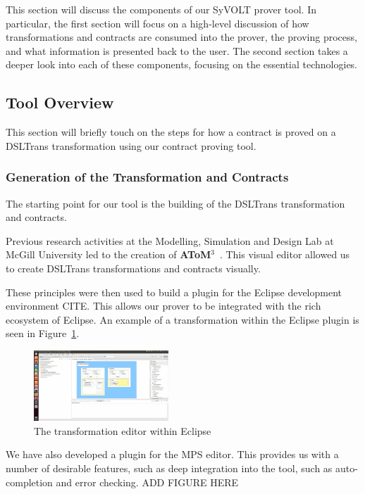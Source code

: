 This section will discuss the components of our SyVOLT prover tool. In particular, the first section will focus on a high-level discussion of how transformations and contracts are consumed into the prover, the proving process, and what information is presented back to the user. The second section takes a deeper look into each of these components, focusing on the essential technologies.

\subsection{Tool Overview}
This section will briefly touch on the steps for how a contract is proved on a DSLTrans transformation using our contract proving tool.


\subsubsection{Generation of the Transformation and Contracts}
The starting point for our tool is the building of the DSLTrans transformation and contracts.

Previous research activities at the Modelling, Simulation and Design Lab at McGill University led to the creation of \textbf{AToM$^3$}~\cite{atom3:2002}. This visual editor allowed us to create DSLTrans transformations and contracts visually.

These principles were then used to build a plugin for the Eclipse development environment CITE. This allows our prover to be integrated with the rich ecosystem of Eclipse. An example of a transformation within the Eclipse plugin is seen in Figure~\ref{fig:eclipse_frontend}.

\begin{figure}
\centering
\includegraphics[width=0.45\textwidth]{figures/syvolt_prover/eclipse_frontend}
\caption{The transformation editor within Eclipse}
\label{fig:eclipse_frontend}
\end{figure}

We have also developed a plugin for the MPS editor. This provides us with a number of desirable features, such as deep integration into the tool, such as auto-completion and error checking. ADD FIGURE HERE

